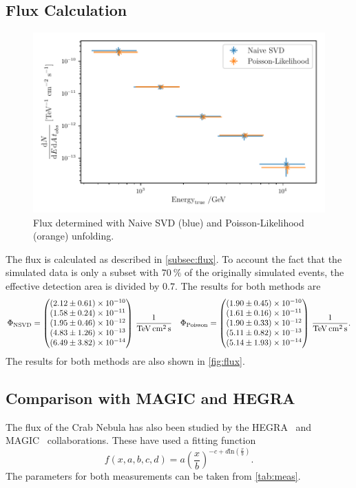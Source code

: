 \subsection{Flux Calculation}

\begin{figure}[tb]
  \centering
  \includegraphics[width=.7\textwidth]{plots/flux.pdf}
  \caption{Flux determined with Naive SVD (blue) and Poisson-Likelihood (orange) unfolding.}
  \label{fig:flux}
\end{figure}

The flux is calculated as described in \autoref{subsec:flux}. To account the fact that the simulated data is only a subset with $\SI{70}{\percent}$ of the originally simulated events, the effective detection area is divided by $\num{0.7}$.
The results for both methods are
\begin{align}
  \Phi_\mathrm{NSVD} = \begin{pmatrix} \num{2.12 \pm .61e-10} \\ \num{1.58 \pm .24e-11} \\ \num{1.95 \pm .46e-12} \\ \num{4.83 \pm 1.26e-13} \\ \num{6.49 \pm 3.82e-14} \end{pmatrix}\,\si{\per\tera\eV\per\cm\squared\per\second} &&  \Phi_\mathrm{Poisson} = \begin{pmatrix} \num{1.90 \pm .45e-10} \\ \num{1.61 \pm .16e-11} \\ \num{1.90 \pm .33e-12} \\ \num{5.11 \pm .82e-13} \\ \num{5.14 \pm 1.93e-14} \end{pmatrix}\,\si{\per\tera\eV\per\cm\squared\per\second}.
\end{align}
The results for both methods are also shown in \autoref{fig:flux}.

\subsection{Comparison with MAGIC and HEGRA}
The flux of the Crab Nebula has also been studied by the HEGRA~\cite{HEGRA} and MAGIC~\cite{MAGIC} collaborations.
These have used a fitting function
\begin{equation}
  f \left( x,a,b,c,d \right) = a \left( \frac{x}{b} \right)^{-c + d \mathrm{ln}\left( \frac{x}{b} \right)}.
\end{equation}
The parameters for both measurements can be taken from \autoref{tab:meas}.

